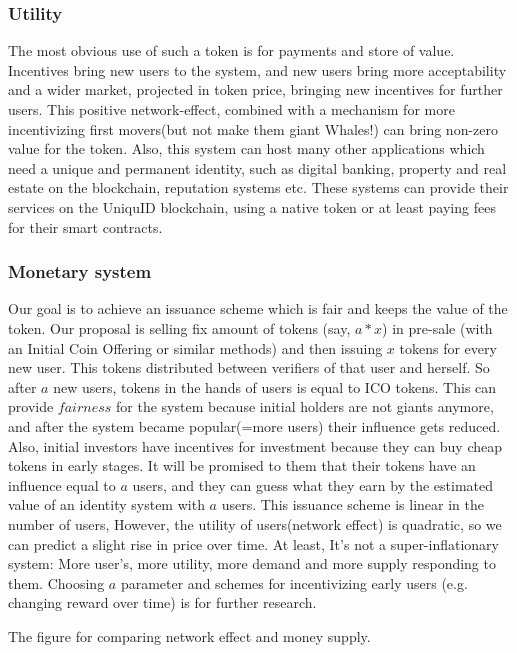 \documentclass[conference]{IEEEtran}
\begin{document}
\subsubsection{Utility} 
The most obvious use of such a token is for payments and store of value. Incentives bring new users to the system, and new users bring more acceptability and a wider market, projected in token price, bringing new incentives for further users. This positive network-effect, combined with a mechanism for more incentivizing first movers(but not make them giant Whales!) can bring non-zero value for the token. Also, this system can host many other applications which need a unique and permanent identity, such as digital banking, property and real estate on the blockchain, reputation systems etc. These systems can provide their services on the UniquID blockchain, using a native token or at least paying fees for their smart contracts.

\subsubsection{Monetary system}
Our goal is to achieve an issuance scheme which is fair and keeps the value of the token. Our proposal is selling fix amount of tokens (say, $a*x$) in pre-sale (with an Initial Coin Offering or similar methods) and then issuing $x$ tokens for every new user. This tokens distributed between verifiers of that user and herself. So after $a$ new users, tokens in the hands of users is equal to ICO tokens. This can provide $fairness$ for the system because initial holders are not giants anymore, and after the system became popular(=more users) their influence gets reduced. Also, initial investors have incentives for investment because they can buy cheap tokens in early stages. It will be promised to them that their tokens have an influence equal to $a$ users, and they can guess what they earn by the estimated value of an identity system with $a$ users. This issuance scheme is linear in the number of users, However, the utility of users(network effect) is quadratic, so we can predict a slight rise in price over time. At least, It's not a super-inflationary system: More user's, more utility, more demand and more supply responding to them. Choosing $a$ parameter and schemes for incentivizing early users (e.g. changing reward over time) is for further research.




The figure for comparing network effect and money supply.
\end{document}
